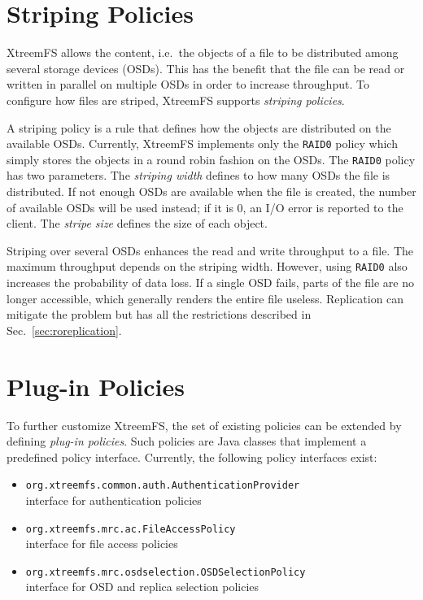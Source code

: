 \documentclass[a4paper,10pt]{book}
\begin{document}
\section{Striping Policies} \label{sec:striping_policies}

XtreemFS allows the content, i.e.\ the objects of a file to be distributed among several storage devices (OSDs). This has the benefit that the file can be read or written in parallel on multiple OSDs in order to increase throughput. To configure how files are striped, XtreemFS supports \emph{striping policies}.

A striping policy is a rule that defines how the objects are distributed on the available OSDs. Currently, XtreemFS implements only the \texttt{RAID0} policy which simply stores the objects in a round robin fashion on the OSDs. The \texttt{RAID0} policy has two parameters. The \emph{striping width} defines to how many OSDs the file is distributed. If not enough OSDs are available when the file is created, the number of available OSDs will be used instead; if it is 0, an I/O error is reported to the client. The \emph{stripe size} defines the size of each object.

Striping over several OSDs enhances the read and write throughput to a file. The maximum throughput depends on the striping width. However, using \texttt{RAID0} also increases the probability of data loss. If a single OSD fails, parts of the file are no longer accessible, which generally renders the entire file useless. Replication can mitigate the problem but has all the restrictions described in Sec.\ \ref{sec:roreplication}.


\section{Plug-in Policies}

To further customize XtreemFS, the set of existing policies can be extended by defining \textit{plug-in policies}. Such policies are Java classes that implement a predefined policy interface. Currently, the following policy interfaces exist:

\begin{itemize}
 \item \texttt{org.xtreemfs.common.auth.AuthenticationProvider}\\
   interface for authentication policies
 \item \texttt{org.xtreemfs.mrc.ac.FileAccessPolicy}\\
   interface for file access policies
 \item \texttt{org.xtreemfs.mrc.osdselection.OSDSelectionPolicy}\\
   interface for OSD and replica selection policies
\end{itemize}
\end{document}

